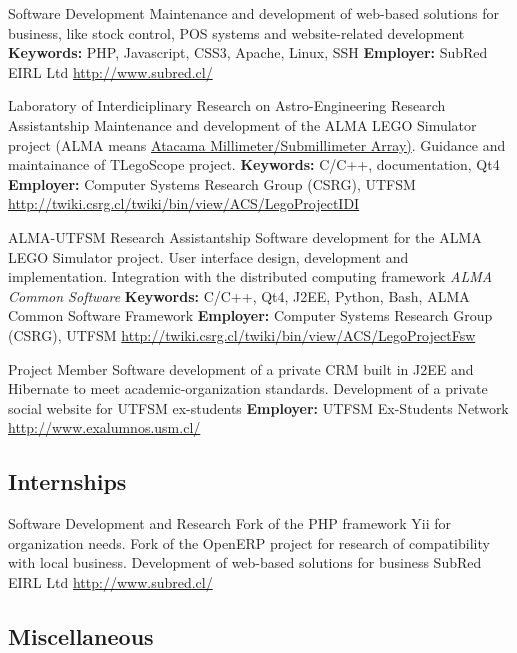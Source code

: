 \documentclass[11pt,a4paper,sans]{moderncv}
\begin{document}
        {Software Development}
        {Maintenance and development of web-based solutions for business, like stock control, POS systems and website-related development}
        {\textbf{Keywords:} PHP, Javascript, CSS3, Apache, Linux, SSH}
        {\textbf{Employer:} SubRed EIRL Ltd}
        {\url{http://www.subred.cl/}}

        {Laboratory of Interdiciplinary Research on Astro-Engineering Research Assistantship}
        {Maintenance and development of the ALMA LEGO Simulator project (ALMA means \href{http://www.alma.cl/}{Atacama Millimeter/Submillimeter Array)}. Guidance and maintainance of TLegoScope project.}
        {\textbf{Keywords:} C/C++, documentation, Qt4}
        {\textbf{Employer:} Computer Systems Research Group (CSRG), UTFSM}
        {\url{http://twiki.csrg.cl/twiki/bin/view/ACS/LegoProjectIDI}}

        {ALMA-UTFSM Research Assistantship}
        {Software development for the ALMA LEGO Simulator project. User interface design, development and implementation. Integration with the distributed computing framework \emph{ALMA Common Software}}
        {\textbf{Keywords:} C/C++, Qt4, J2EE, Python, Bash, ALMA Common Software Framework}
        {\textbf{Employer:} Computer Systems Research Group (CSRG), UTFSM}
        {\url{http://twiki.csrg.cl/twiki/bin/view/ACS/LegoProjectFsw}}
        
        {Project Member}
        {Software development of a private CRM built in J2EE and Hibernate to meet academic-organization standards. Development of a private social website for UTFSM ex-students}
        {\textbf{Employer:} UTFSM Ex-Students Network}
        {}
        {\url{http://www.exalumnos.usm.cl/}}
        
        
\subsection{Internships}


        {Software Development and Research}
        {Fork of the PHP framework Yii for organization needs. Fork of the OpenERP project for research of compatibility with local business. Development of web-based solutions for business}
        {SubRed EIRL Ltd}
        {}
        {\url{http://www.subred.cl/}}
        
        
\subsection{Miscellaneous}
\end{document}
